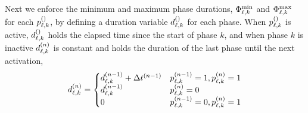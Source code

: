 Next we enforce the minimum and maximum phase durations, $\PTMIN{\ell}{k}$ and $\PTMAX{\ell}{k}$ for each $\p[]{\ell}{k}$, by defining a duration variable $\pd[]{\ell}{k}$ for each phase. When $\p[]{\ell}{k}$ is active, $\pd[]{\ell}{k}$ holds the elapsed time since the start of phase $k$, and when phase $k$ is inactive $\pd{\ell}{k}$ is constant and holds the duration of the last phase until the next activation,
\begin{equation}
\pd{\ell}{k} = 
\begin{cases}
\pd[n-1]{\ell}{k} + \DT[n-1] & \p[n-1]{\ell}{k}=1,\p{\ell}{k}=1\\
\pd[n-1]{\ell}{k} & \p{\ell}{k}=0\\
0 & \p[n-1]{\ell}{k}=0,\p{\ell}{k}=1
\end{cases}
\end{equation}

